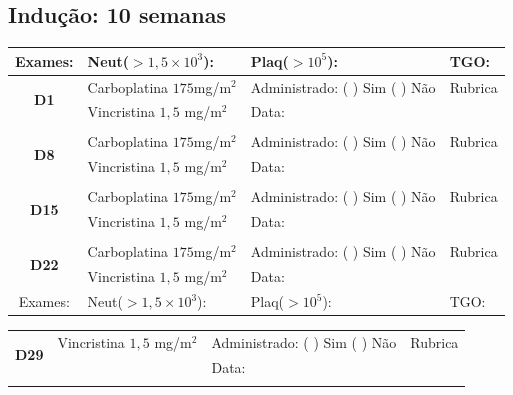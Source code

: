 \documentclass[11pt,a4paper,oldfontcommands]{memoir}
\begin{document}
\subsection{Indução: 10 semanas}
\renewcommand{\arraystretch}{1.3}
\begin{center}
\begin{table}[H]
\begin{tabular}{p{1.3cm}p{4.9cm}|p{4.7cm}|p{3cm}}
    \hline
    \multicolumn{1}{c|}{Exames:}&{Neut(\(>1,5\times10^3\)):}&{Plaq(\(>10^5\)):}&{TGO:}\\
    \hline
    \multicolumn{1}{c|}{\multirow{2}{*}{\textbf{D1}}}&{Carboplatina \(175\)mg/m\(^2\)}&{Administrado: (  ) Sim (  ) Não}&{Rubrica}\\
    \multicolumn{1}{c|}{}&{Vincristina \(1,5\) mg/m\(^2\)}&{Data:}&\\
    \hline\\
    \hline
    \multicolumn{1}{c|}{\multirow{2}{*}{\textbf{D8}}}&{Carboplatina \(175\)mg/m\(^2\)}&{Administrado: (  ) Sim (  ) Não}&{Rubrica}\\
    \multicolumn{1}{c|}{}&{Vincristina \(1,5\) mg/m\(^2\)}&{Data:}&\\
    \hline
    \\
    \hline
    \multicolumn{1}{c|}{\multirow{2}{*}{\textbf{D15}}}&{Carboplatina \(175\)mg/m\(^2\)}&{Administrado: (  ) Sim (  ) Não}&{Rubrica}\\
    \multicolumn{1}{c|}{}&{Vincristina \(1,5\) mg/m\(^2\)}&{Data:}&\\
    \hline
    \\
    \hline
    \multicolumn{1}{c|}{\multirow{2}{*}{\textbf{D22}}}&{Carboplatina \(175\)mg/m\(^2\)}&{Administrado: (  ) Sim (  ) Não}&{Rubrica}\\
    \multicolumn{1}{c|}{}&{Vincristina \(1,5\) mg/m\(^2\)}&{Data:}&\\
    \hline
    \multicolumn{1}{c|}{Exames:}&{Neut(\(>1,5\times10^3\)):}&{Plaq(\(>10^5\)):}&{TGO:}
    \\
    \hline
\end{tabular}
\end{table}
\begin{table}[H]
\begin{tabular}{p{1.3cm}p{4.9cm}|p{4.7cm}|p{3cm}}
    \hline
    \multicolumn{1}{c|}{\multirow{2}{*}{\textbf{D29}}}&{Vincristina \(1,5\) mg/m\(^2\)}&{Administrado: (  ) Sim (  ) Não}&{Rubrica}\\
    \multicolumn{1}{c|}{}&&{Data:}&\\
    \hline
    \\

\end{tabular}
\end{table}
\end{center}
\end{document}
